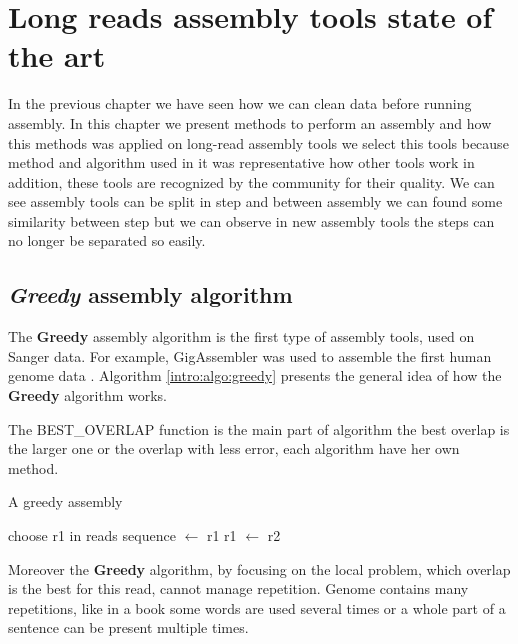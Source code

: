 \documentclass[main]{subfiles}
\begin{document}
\chapter{Long reads assembly tools state of the art}\label{chapter:sota}

In the previous chapter we have seen how we can clean data before running assembly. In this chapter we present methods to perform an assembly and how this methods was applied on long-read assembly tools we select this tools because method and algorithm used in it was representative how other tools work in addition, these tools are recognized by the community for their quality. We can see assembly tools can be split in step and between assembly we can found some similarity between step but we can observe in new assembly tools the steps can no longer be separated so easily.

\section{\textit{Greedy} assembly algorithm}

The \textbf{Greedy} assembly algorithm is the first type of assembly tools, used on Sanger data. For example, GigAssembler was used to assemble the first human genome data \cite{GigAssembler}. Algorithm \ref{intro:algo:greedy} presents the general idea of how the \textbf{Greedy} algorithm works.

The BEST\_OVERLAP function is the main part of algorithm the best overlap is the larger one or the overlap with less error, each algorithm have her own method.

\begin{algorithm}[ht]
    \caption{A greedy assembly}
    \begin{algorithmic}[1]
        \State choose r1 in reads
        \State sequence $\leftarrow$ r1
            \State {}
            \State {}
            \State r1 $\leftarrow$ r2
        \EndWhile
    \EndFunction
    \end{algorithmic}
    \label{intro:algo:greedy}
\end{algorithm}

Moreover the \textbf{Greedy} algorithm, by focusing on the local problem, which overlap is the best for this read, cannot manage repetition. Genome contains many repetitions, like in a book some words are used several times or a whole part of a sentence can be present multiple times.
\end{document}

